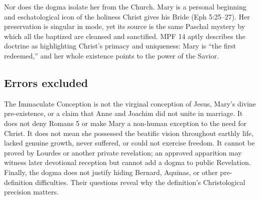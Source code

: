 Nor does the dogma isolate her from the Church. Mary is a personal beginning and eschatological icon of the holiness Christ gives his Bride (Eph 5:25--27). Her preservation is singular in mode, yet its source is the same Paschal mystery by which all the baptized are cleansed and sanctified. MPF 14 aptly describes the doctrine as highlighting Christ's primacy and uniqueness: Mary is ``the first redeemed,'' and her whole existence points to the power of the Savior.

\subsection{Errors excluded}

The Immaculate Conception is not the virginal conception of Jesus, Mary's divine pre-existence, or a claim that Anne and Joachim did not unite in marriage. It does not deny Romans 5 or make Mary a non-human exception to the need for Christ. It does not mean she possessed the beatific vision throughout earthly life, lacked genuine growth, never suffered, or could not exercise freedom. It cannot be proved by Lourdes or another private revelation; an approved apparition may witness later devotional reception but cannot add a dogma to public Revelation. Finally, the dogma does not justify hiding Bernard, Aquinas, or other pre-definition difficulties. Their questions reveal why the definition's Christological precision matters.
